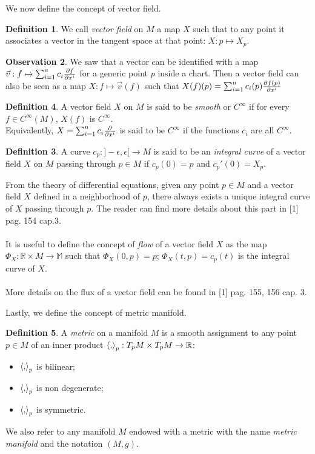 \documentclass[12pt,a4paper]{report}
\theoremstyle{definition}
\newtheorem{Def}{Definition}[chapter]
\theoremstyle{Theorem}
\theoremstyle{definition}
\theoremstyle{definition}
\newtheorem{Obs}[Def]{Observation}
\begin{document}
	We now define the concept of vector field.
	\begin{Def}
		We call \textit{vector field} on $M$ a map $X$ such that to any point it associates a vector in the tangent space at that point: $X:p\mapsto X_p$. 
	\end{Def}
	\begin{Obs}
		We saw that a vector can be identified with a map $\vec{v}:f\mapsto\sum_{i=1}^{n}c_i{\partial f\over \partial x^i}$ for a generic point $p$ inside a chart. Then a vector field can also be seen as a map $X:f\mapsto\vec{v}(f)$ such that $X(f)(p)=\sum_{i=1}^{n}c_i(p){\partial f(p)\over \partial x^i}$
	\end{Obs}
	\begin{Def}
		A vector field $X$ on $M$ is said to be \textit{smooth} or $C^\infty$ if for every $f\in C^\infty(M)$, $X(f)$ is $C^\infty$.
		\\
		Equivalently, $X=\sum_{i=1}^{n}c_i{\partial\over \partial x^i}$ is said to be $C^\infty$ if the functions $c_i$ are all $C^\infty$.
		\begin{Def}
			A curve $c_p:]-\epsilon,\epsilon[\rightarrow M$ is said to be an \textit{integral curve} of a vector field $X$ on $M$ passing through $p\in M$ if $c_p(0)=p$ and $c_p'(0)=X_p$.
		\end{Def}
		From the theory of differential equations, given any point $p\in M$ and a vector field $X$ defined in a neighborhood of $p$, there always exists a unique integral curve of $X$ passing through $p$. The reader can find more details about this part in [1] pag. 154 cap.3.\\
		\\
		It is useful to define the concept of \textit{flow} of a vector field $X$ as the map $\Phi_X:\mathbb{R}\times M\rightarrow\mathbb{M}$ such that $\Phi_X(0,p)=p$; $\Phi_X(t,p)=c_p(t)$ is the integral curve of $X$.\\
		\\
		More details on the flux of a vector field can be found in [1] pag. 155, 156 cap. 3.
	\end{Def}
	Lastly, we define the concept of metric manifold.
	\begin{Def}
		A \textit{metric} on a manifold $M$ is a smooth assignment to any point $p\in M$ of an inner product $\braket{,}_p:T_pM\times T_pM\rightarrow \mathbb{R}$:
		\begin{itemize}
			\item $\braket{,}_p$ is bilinear;
			\item $\braket{,}_p$ is non degenerate;
			\item $\braket{,}_p$ is symmetric.
		\end{itemize}
		We also refer to any manifold $M$ endowed with a metric with the name \textit{metric manifold} and the notation $(M,g)$.
	\end{Def}
\end{document}
